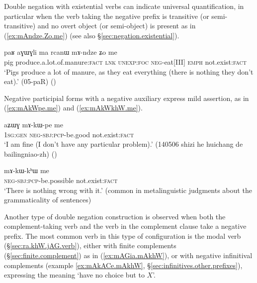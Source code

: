 Double negation with existential verbs can indicate universal quantification, in particular when the verb taking the negative prefix is transitive (or semi-transitive) and no overt object (or semi-object) is present as in (\ref{ex:mAndze.Zo.me}) (see also §\ref{sec:negation.existential}).

\begin{exe}
	\ex \label{ex:mAndze.Zo.me}
	\gll paʁ aɣɯɣli ma rcanɯ mɤ-ndze ʑo me  \\
	pig produce.a.lot.of.manure:\textsc{fact} \textsc{lnk} \textsc{unexp}:\textsc{foc} \textsc{neg}-eat[III] \textsc{emph} not.exist:\textsc{fact} \\
	\glt `Pigs produce a lot of manure, as they eat everything (there is nothing they don't eat).' (05-paR)
()
\end{exe}
Negative participial forms with a negative auxiliary express mild assertion, as in (\ref{ex:mAkWpe.me}) and (\ref{ex:mAkWkhW.me}).

\begin{exe}
	\ex \label{ex:mAkWpe.me}
	\gll aʑɯɣ mɤ-kɯ-pe me \\
	\textsc{1sg}:\textsc{gen} \textsc{neg}-\textsc{sbj}:\textsc{pcp}-be.good not.exist:\textsc{fact} \\
	\glt `I am fine (I don't have any particular problem).' (140506 shizi he huichang de bailingniao-zh) ()
\end{exe}

\begin{exe}
	\ex \label{ex:mAkWkhW.me}
	\gll mɤ-kɯ-kʰɯ me \\
	\textsc{neg}-\textsc{sbj}:\textsc{pcp}-be.possible not.exist:\textsc{fact} \\
	\glt `There is nothing wrong with it.' (common in metalinguistic judgments about the grammaticality of sentences)
\end{exe}

Another type of double negation construction is observed when both the com\-plement-taking verb and the verb in the complement clause take a negative prefix. The most common verb in this type of configuration is the modal verb  (§\ref{sec:ra.khW.jAG.verb}), either with finite complements (§\ref{sec:finite.complement}) as in (\ref{ex:mAGia.mAkhW}), or with negative infinitival complements (example \ref{ex:mAkACe.mAkhW}, §\ref{sec:infinitives.other.prefixes}), expressing the meaning `have no choice but to $X$'.


